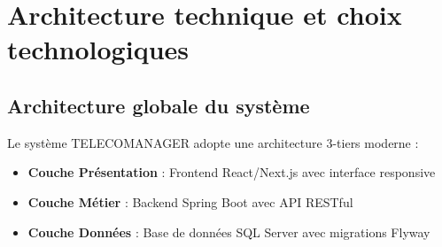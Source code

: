 \documentclass[12pt,a4paper]{report}
\begin{document}
\section{Architecture technique et choix technologiques}

\subsection{Architecture globale du système}

Le système TELECOMANAGER adopte une architecture 3-tiers moderne :

\begin{itemize}
\item \textbf{Couche Présentation} : Frontend React/Next.js avec interface responsive
\item \textbf{Couche Métier} : Backend Spring Boot avec API RESTful
\item \textbf{Couche Données} : Base de données SQL Server avec migrations Flyway
\end{itemize}
\end{document}
